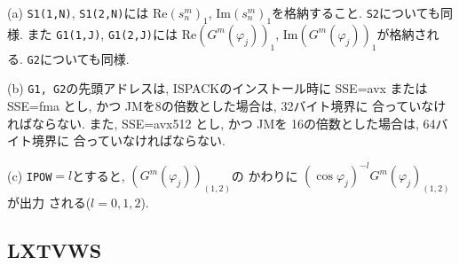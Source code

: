 \documentclass[a4j]{jarticle}
\begin{document}
\begin{enumerate}
  (a) \texttt{S1(1,N)}, \texttt{S1(2,N)}には
  $\mbox{Re}(s^m_n)_1$, $\mbox{Im}(s^m_n)_1$を格納すること.
  \texttt{S2}についても同様.
  また
\texttt{G1(1,J)}, \texttt{G1(2,J)}には  $\mbox{Re}(G^m(\varphi_j))_1$, 
$\mbox{Im}(G^m(\varphi_j))_1$が格納される. \texttt{G2}についても同様.
  
(b) \texttt{G1, G2}の先頭アドレスは, 
ISPACKのインストール時に SSE=avx または SSE=fma とし, かつ
JMを8の倍数とした場合は, 32バイト境界に
合っていなければならない.
また, SSE=avx512 とし, かつ
JMを 16の倍数とした場合は, 64バイト境界に
合っていなければならない.

(c) \texttt{IPOW}$=l$とすると, $(G^m(\varphi_j))_{(1,2)}$の
    かわりに $(\cos\varphi_j)^{-l}G^m(\varphi_j)_{(1,2)}$ が出力
    される($l=0,1,2$).

\end{enumerate}


\subsection{LXTVWS}
\end{document}
